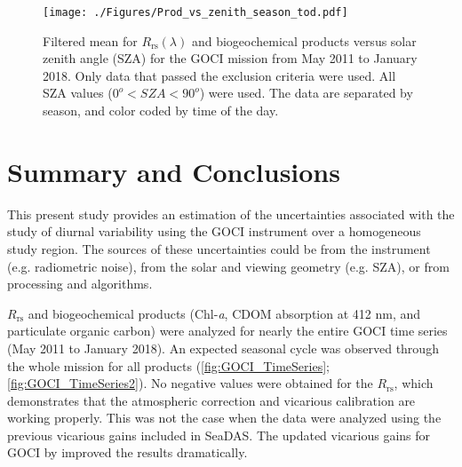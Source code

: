 \documentclass[remotesensing,article,submit,moreauthors,pdftex,10pt,a4paper]{Definitions/mdpi}
\begin{document}
\begin{figure}[htbp!]
  \texttt{[image: ./Figures/Prod\_vs\_zenith\_season\_tod.pdf]}
  \caption{Filtered mean for $R_\text{rs}(\lambda)$ and biogeochemical products versus solar zenith angle (SZA) for the GOCI mission from May 2011 to January 2018. Only data that passed the exclusion criteria were used. All SZA values ($0^o<SZA<90^o$) were used. The data are separated by season, and color coded by time of the day. \label{fig:Prod_vs_zenith_season_tod} } 
\end{figure}

\section{Summary and Conclusions} 





This present study provides an estimation of the uncertainties associated with the study of diurnal variability using the GOCI instrument over a homogeneous study region. The sources of these uncertainties could be from the instrument (e.g. radiometric noise), from the solar and viewing geometry (e.g. SZA), or from processing and algorithms. 

$R_\text{rs}$ and biogeochemical products (Chl-{\it a}, CDOM absorption at 412 nm, and particulate organic carbon) were analyzed for nearly the entire GOCI time series (May 2011 to January 2018). An expected seasonal cycle was observed through the whole mission for all products (\autoref{fig:GOCI_TimeSeries}; \autoref{fig:GOCI_TimeSeries2}). No negative values were obtained for the $R_\text{rs}$, which demonstrates that the atmospheric correction and vicarious calibration are working properly. This was not the case when the data were analyzed using the previous vicarious gains included in SeaDAS. The updated vicarious gains for GOCI by \cite{Concha_2018a} improved the results dramatically.
\end{document}
